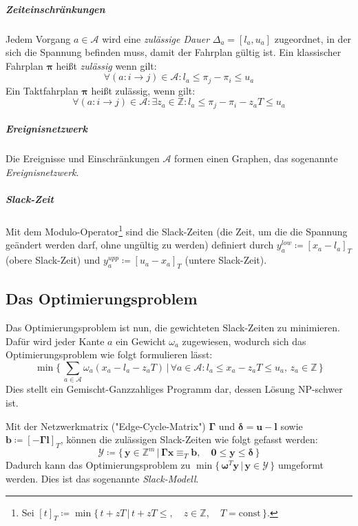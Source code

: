 \documentclass[a4paper, 10pt, twocolumn]{scrartcl}
\newcommand{\const}{\ensuremath{\textrm{const}}}
\newcommand{\Z}{\ensuremath{\mathbb{Z}}}
\newcommand{\mat}[1]{\boldsymbol{#1}}
\renewcommand{\vec}[1]{\boldsymbol{#1}}
\begin{document}
		\subparagraph{Zeiteinschränkungen}
		Jedem Vorgang \( a \in \mathcal{A} \) wird eine \emph{zulässige Dauer} \( \Delta_a = [l_a, u_a] \) zugeordnet, in der sich die Spannung befinden muss, damit der Fahrplan gültig ist. Ein klassischer Fahrplan \(\vec{\pi}\) heißt \emph{zulässig} wenn gilt:
		\begin{equation*}
			\forall (a : i \to j) \in \mathcal{A} : l_a \leq \pi_j - \pi_i \leq u_a
		\end{equation*}
		Ein Taktfahrplan \( \vec{\pi} \) heißt zulässig, wenn gilt:
		\begin{equation*}
			\forall (a : i \to j) \in \mathcal{A} : \exists z_a \in \Z : l_a \leq \pi_j - \pi_i - z_a T \leq u_a
		\end{equation*}
		
		\subparagraph{Ereignisnetzwerk}
		Die Ereignisse und Einschränkungen \( \mathcal{A} \) formen einen Graphen, das sogenannte \emph{Ereignisnetzwerk}.
		
		\subparagraph{Slack-Zeit}
		Mit dem Modulo-Operator\footnote{Sei \( [t]_T \coloneqq \min \{\, t + zT \,\vert\, t + zT \leq,\quad z \in \Z,\quad T = \const \,\} \).} sind die Slack-Zeiten (die Zeit, um die die Spannung geändert werden darf, ohne ungültig zu werden) definiert durch \( y_a^\mathit{low} \coloneqq [x_a - l_a]_T \) (obere Slack-Zeit) und \( y_a^\mathit{upp} \coloneqq [u_a - x_a]_T \) (untere Slack-Zeit).
		
	\subsection*{Das Optimierungsproblem}
		Das Optimierungsproblem ist nun, die gewichteten Slack-Zeiten zu minimieren. Dafür wird jeder Kante \( a \) ein Gewicht \( \omega_a \) zugewiesen, wodurch sich das Optimierungsproblem wie folgt formulieren lässt:
		{\small
		\begin{equation*}
			\min \Bigg\{\, \sum_{a \in \mathcal{A}} \omega_a (x_a - l_a - z_a T) \,\bigg\vert\, \forall a \in \mathcal{A} : l_a \leq x_a - z_a T \leq u_a,\, z_a \in \Z \,\Bigg\}
		\end{equation*}}
		Dies stellt ein Gemischt-Ganzzahliges Programm dar, dessen Lösung NP-schwer ist.
		
		Mit der Netzwerkmatrix ("Edge-Cycle-Matrix") \( \mat{\Gamma} \) und \( \vec{\delta} = \vec{u} - \vec{l} \) sowie \( \vec{b} \coloneqq [-\mat{\Gamma} \vec{l}]_T \), können die zulässigen Slack-Zeiten wie folgt gefasst werden:
		\begin{equation*}
			\mathcal{Y} \coloneqq \big\{\, \vec{y} \in \Z^m \,\vert\, \mat{\Gamma} \vec{x} \equiv_T \vec{b},\quad \vec{0} \leq \vec{y} \leq \vec{\delta} \,\big\}
		\end{equation*}
		Dadurch kann das Optimierungsproblem zu \( \min \big\{\, \vec{\omega}^T \vec{y} \,\vert\, \vec{y} \in \mathcal{Y} \,\big\} \) umgeformt werden. Dies ist das sogenannte \emph{Slack-Modell}.
		
\end{document}
